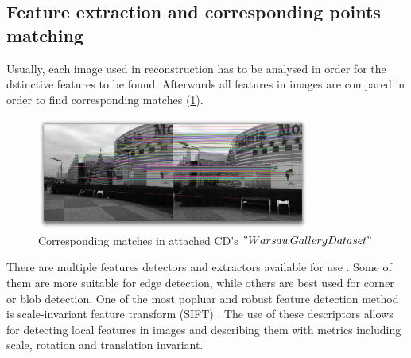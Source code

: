 \subsection{Feature extraction and corresponding points matching}
Usually, each image used in reconstruction has to be analysed in order for the dstinctive features to be found. Afterwards all features in images are compared in order to find corresponding matches (\ref{fig:correspondingMatches}).
\begin{figure}[p]
    \centering
    \includegraphics[width=0.8\textwidth]{correspondingMatching}
    \caption{Corresponding matches in attached CD's $"Warsaw Gallery Dataset"$}
    \label{fig:correspondingMatches}
\end{figure}
There are multiple features detectors and extractors available for use \cite{website:featureDetection}. Some of them are more suitable for edge detection, while others are best used for corner or blob detection. One of the most popluar and robust feature detection method is scale-invariant feature transform (SIFT) \cite{website:SIFT}. The use of these descriptors allows for detecting local features in images and describing them with metrics including scale, rotation and translation invariant.
